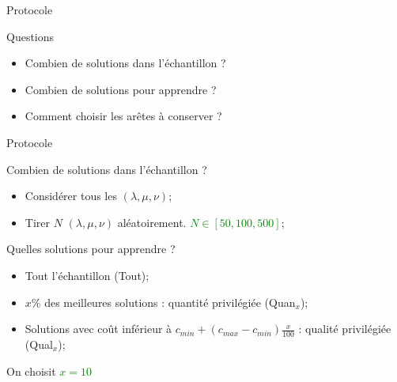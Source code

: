 \documentclass{beamer}
\begin{document}
\begin{frame}{Protocole}
\begin{alertblock}{Questions}
\begin{itemize}
\item Combien de solutions dans l'échantillon ?
\item Combien de solutions pour apprendre ?
\item Comment choisir les arêtes à conserver ?
\end{itemize}
\end{alertblock}
\end{frame}

\begin{frame}{Protocole}

\begin{block}{Combien de solutions dans l'échantillon ?}
\begin{itemize}
\item Considérer tous les $(\lambda,\mu,\nu)$;
\item Tirer $N$ $(\lambda,\mu,\nu)$ aléatoirement. \textcolor{green}{$N \in [50,100,500]$};
\end{itemize}
\end{block}

\begin{block}{Quelles solutions pour apprendre ?}
\begin{itemize}
\item Tout l'échantillon (Tout);
\item $x\%$ des meilleures solutions : quantité privilégiée (Quan$_{x}$);
\item Solutions avec coût inférieur à $c_{min} + (c_{max}-c_{min})\frac{x}{100}$ : qualité privilégiée (Qual$_{x}$);
\end{itemize}
On choisit \textcolor{green}{$x = 10$}
\end{block}
\end{frame}
\end{document}
